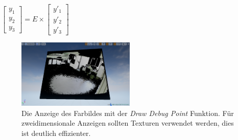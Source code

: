 \documentclass[a4paper]{IEEEtran}
\begin{document}
$\begin{bmatrix}
y_1 \\
y_2 \\
y_3
\end{bmatrix}
= E
\times
\begin{bmatrix}
y'_1 \\
y'_2 \\
y'_3
\end{bmatrix}$\\[1cm]

\begin{figure}[!h]
    	\centering
		\includegraphics[width=0.5\textwidth]{img/2DColor}
	    \caption{Die Anzeige des Farbildes mit der {\textit{Draw Debug Point}} Funktion. Für zweidimensionale Anzeigen sollten Texturen verwendet werden, dies ist deutlich effizienter.}
    	\label{2DColor}
	\end{figure} 
	
\end{document}
